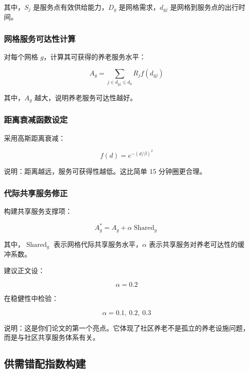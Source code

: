 其中，$S_j$ 是服务点有效供给能力，$D_g$ 是网格需求，$d_{gj}$ 是网格到服务点的出行时间。

\subsubsection{网格服务可达性计算}

对每个网格 $g$，计算其可获得的养老服务水平：

\begin{equation}
A_g = \sum_{j \in d_{gj} \leq d_0} R_j f(d_{gj})
\end{equation}

其中，$A_g$ 越大，说明养老服务可达性越好。

\subsubsection{距离衰减函数设定}

采用高斯距离衰减：

\begin{equation}
f(d)=e^{-(d/\beta)^2}
\end{equation}

说明：距离越远，服务可获得性越低。这比简单 15 分钟圈更合理。

\subsubsection{代际共享服务修正}

构建共享服务支撑项：

\begin{equation}
A_g^{*}=A_g+\alpha \operatorname{Shared}_g
\end{equation}

其中，$\operatorname{Shared}_g$ 表示网格代际共享服务水平，$\alpha$ 表示共享服务对养老可达性的缓冲系数。

建议正文设：

\begin{equation}
\alpha = 0.2
\end{equation}

在稳健性中检验：

\begin{equation}
\alpha = 0.1,\ 0.2,\ 0.3
\end{equation}

说明：这是你们论文的第一个亮点。它体现了社区养老不是孤立的养老设施问题，而是与社区共享服务体系有关。

\subsection{供需错配指数构建}

